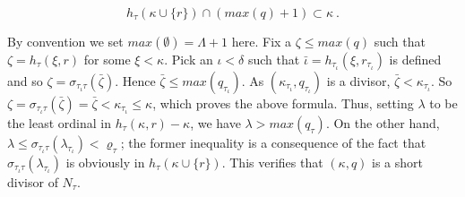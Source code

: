 \documentclass[12pt]{article}
\begin{document}
\[
h_\tau ( \kappa \cup \{ r \} ) \cap ( max (q) + 1 ) \subset \kappa \ .
\]

By convention we set $max ( \emptyset ) = \Lambda + 1$ here.  Fix a $\zeta \leq max (q)$ such that $\zeta = h_\tau (\xi , r)$ for some $\xi < \kappa$.  Pick an $\iota < \delta$ such that $\bar{\iota} = h_{\tau_\iota} ( \xi , r_{\tau_\iota})$ is defined and so $\zeta = \sigma_{\tau_\iota \tau} (\bar{\zeta})$.  Hence $\bar{\zeta} \leq max ( q_{\tau_\iota})$.  As $(\kappa_{\tau_\iota} , q_{\tau_\iota})$ is a divisor, $\bar{\zeta} < \kappa_{\tau_\iota}$.  So $\zeta = \sigma_{\tau_\iota \tau} ( \bar{\zeta}) = \bar{\zeta} < \kappa_{\tau_\iota} \leq \kappa$, which proves the above formula.  Thus, setting $\lambda$ to be the least ordinal in $h_\tau (\kappa , r ) - \kappa$, we have $\lambda > max (q_\tau)$.  On the other hand, $\lambda \leq \sigma_{\tau_\iota \tau} ( \lambda_{\tau_\iota}) < \varrho_\tau$; the former inequality is a consequence of the fact that $\sigma_{\tau_\iota \tau} ( \lambda_{\tau_\iota})$ is obviously in $h_\tau ( \kappa \cup \{ r \} )$.  This verifies that $(\kappa , q )$ is a short divisor of $N_\tau$.\\
\end{document}

